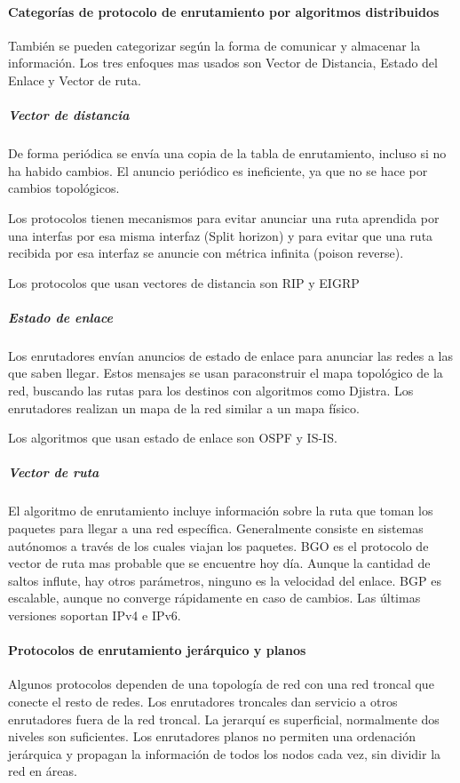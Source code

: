         \paragraph{Categorías de protocolo de enrutamiento por algoritmos distribuidos}
            También se pueden categorizar según la forma de comunicar y almacenar la información. Los tres enfoques mas usados son Vector de Distancia, Estado del Enlace y Vector de ruta.

            \subparagraph{Vector de distancia}
                De forma periódica se envía una copia de la tabla de enrutamiento, incluso si no ha habido cambios. El anuncio periódico es ineficiente, ya que no se hace por cambios topológicos.

                Los protocolos tienen mecanismos para evitar anunciar una ruta aprendida por una interfas por esa misma interfaz (Split horizon) y para evitar que una ruta recibida por esa interfaz se anuncie con métrica infinita (poison reverse).

                Los protocolos que usan vectores de distancia son RIP y EIGRP

            \subparagraph{Estado de enlace}
                Los enrutadores envían anuncios de estado de enlace para anunciar las redes a las que saben llegar. Estos mensajes se usan paraconstruir el mapa topológico de la red, buscando las rutas para los destinos con algoritmos como Djistra. Los enrutadores realizan un mapa de la red similar a un mapa físico.

                Los algoritmos que usan estado de enlace son OSPF y IS-IS.

            \subparagraph{Vector de ruta}
                El algoritmo de enrutamiento incluye información sobre la ruta que toman los paquetes para llegar a una red específica. Generalmente consiste en sistemas autónomos a través de los cuales viajan los paquetes. BGO es el protocolo de vector de ruta mas probable que se encuentre hoy día. Aunque la cantidad de saltos influte, hay otros parámetros, ninguno es la velocidad del enlace. BGP es escalable, aunque no converge rápidamente en caso de cambios. Las últimas versiones soportan IPv4 e IPv6.

        \paragraph{Protocolos de enrutamiento jerárquico y planos}
            Algunos protocolos dependen de una topología de red con una red troncal que conecte el resto de redes. Los enrutadores troncales dan servicio a otros enrutadores fuera de la red troncal. La jerarquí es superficial, normalmente dos niveles son suficientes. Los enrutadores planos no permiten una ordenación jerárquica y propagan la información de todos los nodos cada vez, sin dividir la red en áreas.

